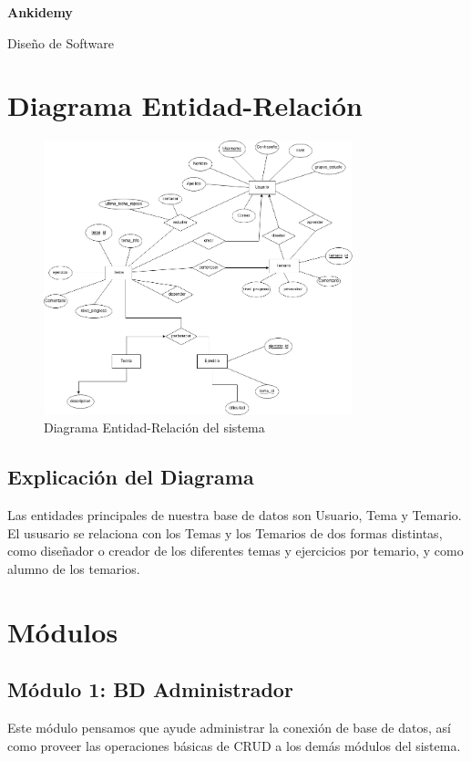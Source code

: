 \documentclass{report}
\begin{document}
\begin{titlepage}
    \centering
    \vfill
    {\Huge\bfseries Ankidemy}\par
    \vspace{1cm}
    {\LARGE Diseño de Software}\par
    \vfill
\end{titlepage}

\chapter{Diagrama Entidad-Relación}
\begin{figure}[H]
    \centering
    \includegraphics[width=0.8\textwidth]{./Diagramas/Diagrama-ER.png}
    \caption{Diagrama Entidad-Relación del sistema}
    \label{fig:er}
\end{figure}

\section{Explicación del Diagrama}
Las entidades principales de nuestra base de datos son Usuario, Tema y Temario. El ususario se relaciona con los Temas y los Temarios de dos formas distintas, como diseñador o creador de los diferentes temas y ejercicios por temario, y como alumno de los temarios.

\chapter{Módulos}

\section{Módulo 1: BD Administrador}
Este módulo pensamos que ayude administrar la conexión de base de datos, así como proveer las operaciones básicas de CRUD a los demás módulos del sistema.
\end{document}
